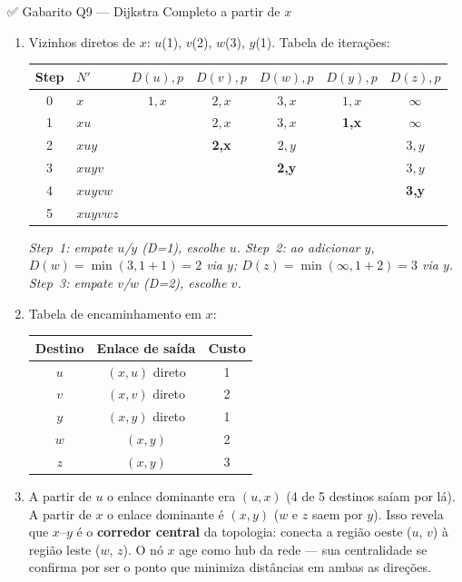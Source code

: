 \documentclass[11pt,a4paper]{article}
\begin{document}
\begin{gabaritocaixa}{✅ Gabarito Q9 --- Dijkstra Completo a partir de $x$}
\begin{enumerate}[label=(\alph*)]
    \item Vizinhos diretos de $x$: $u$(1), $v$(2), $w$(3), $y$(1). Tabela de iterações:
\begin{center}
\begin{tabular}{c l c c c c c}
\toprule
\textbf{Step} & $N'$ & $D(u),p$ & $D(v),p$ & $D(w),p$ & $D(y),p$ & $D(z),p$ \\
\midrule
0 & $x$ & $1,x$ & $2,x$ & $3,x$ & $1,x$ & $\infty$ \\
1 & $xu$ & & $2,x$ & $3,x$ & \textbf{1,x} & $\infty$ \\
2 & $xuy$ & & \textbf{2,x} & $2,y$ & & $3,y$ \\
3 & $xuyv$ & & & \textbf{2,y} & & $3,y$ \\
4 & $xuyvw$ & & & & & \textbf{3,y} \\
5 & $xuyvwz$ & & & & & \\
\bottomrule
\end{tabular}
\end{center}
\textit{Step~1: empate $u$/$y$ (D=1), escolhe $u$. Step~2: ao adicionar $y$, $D(w)=\min(3,1{+}1)=2$ via $y$; $D(z)=\min(\infty,1{+}2)=3$ via $y$. Step~3: empate $v$/$w$ (D=2), escolhe $v$.}

    \item Tabela de encaminhamento em $x$:
\begin{center}
\begin{tabular}{ccc}
\toprule
\textbf{Destino} & \textbf{Enlace de saída} & \textbf{Custo} \\
\midrule
$u$ & $(x,u)$ direto & 1 \\
$v$ & $(x,v)$ direto & 2 \\
$y$ & $(x,y)$ direto & 1 \\
$w$ & $(x,y)$ & 2 \\
$z$ & $(x,y)$ & 3 \\
\bottomrule
\end{tabular}
\end{center}

    \item A partir de $u$ o enlace dominante era $(u,x)$ (4 de 5 destinos saíam por lá). A partir de $x$ o enlace dominante é $(x,y)$ ($w$ e $z$ saem por $y$). Isso revela que $x$--$y$ é o \textbf{corredor central} da topologia: conecta a região oeste ($u$, $v$) à região leste ($w$, $z$). O nó $x$ age como hub da rede --- sua centralidade se confirma por ser o ponto que minimiza distâncias em ambas as direções.
\end{enumerate}
\end{gabaritocaixa}
\end{document}
